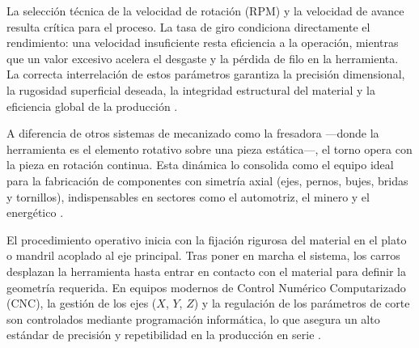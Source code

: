\documentclass[12pt,a4paper]{article}
\begin{document}
La selección técnica de la velocidad de rotación (RPM) y la velocidad de avance resulta crítica para el proceso. La tasa de giro condiciona directamente el rendimiento: una velocidad insuficiente resta eficiencia a la operación, mientras que un valor excesivo acelera el desgaste y la pérdida de filo en la herramienta. La correcta interrelación de estos parámetros garantiza la precisión dimensional, la rugosidad superficial deseada, la integridad estructural del material y la eficiencia global de la producción \cite{boothroyd2006}.

A diferencia de otros sistemas de mecanizado como la fresadora ---donde la herramienta es el elemento rotativo sobre una pieza estática---, el torno opera con la pieza en rotación continua. Esta dinámica lo consolida como el equipo ideal para la fabricación de componentes con simetría axial (ejes, pernos, bujes, bridas y tornillos), indispensables en sectores como el automotriz, el minero y el energético \cite{kalpakjian2020}.

El procedimiento operativo inicia con la fijación rigurosa del material en el plato o mandril acoplado al eje principal. Tras poner en marcha el sistema, los carros desplazan la herramienta hasta entrar en contacto con el material para definir la geometría requerida. En equipos modernos de Control Numérico Computarizado (CNC), la gestión de los ejes ($X$, $Y$, $Z$) y la regulación de los parámetros de corte son controlados mediante programación informática, lo que asegura un alto estándar de precisión y repetibilidad en la producción en serie \cite{altintas2012}.
\end{document}
